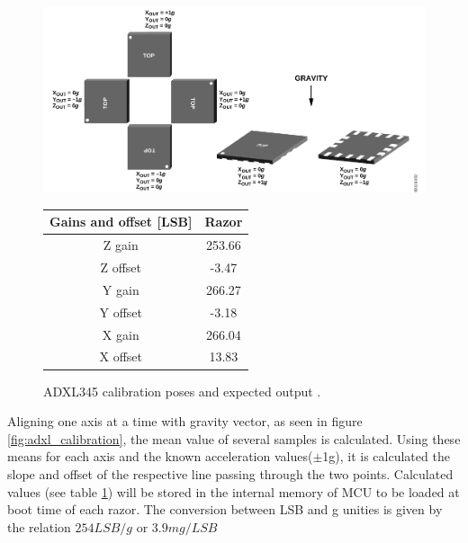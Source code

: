 \begin{figure}[!hbt]
	\begin{minipage}{0.49\textwidth}
		\centering
		\includegraphics[width=\textwidth]{figures/adxl_calibration.png}
		\caption[ADXL345 calibration poses and expected output.]{ADXL345 calibration
			poses and expected output \cite{adxl345AN1077}.} 
		\label{fig:adxl_calibration}
	\end{minipage}
	\hfill
	\begin{minipage}{0.49\textwidth}
		\renewcommand{\arraystretch}{1.2} %
		\centering
		\begin{tabular}{cc}
			\toprule
			\textbf{Gains and offset [LSB]} & \textbf{Razor }\\
			\midrule
			Z gain   &  253.66  \\
			Z offset & -3.47    \\
			Y gain	 & 266.27    \\
			Y offset & -3.18     \\
			X gain   & 266.04   \\
			X offset & 13.83	\\
			\bottomrule
		\end{tabular}
		\label{tab:adxl_summary}
	\end{minipage}
\end{figure}

Aligning one axis at a time with gravity vector, as seen in figure
\ref{fig:adxl_calibration}, the mean value of several samples is calculated.
Using these means for each axis and the known acceleration
values(\ensuremath{\pm}1g), it is calculated the slope and offset of the
respective line passing through the two points. Calculated values (see table \ref{tab:adxl_summary}) will be stored
in the internal  memory of \gls{MCU} to be loaded at
boot time of each razor. The conversion between LSB and g unities is given by
the relation $254LSB/g$ or $3.9mg/LSB$ \cite{adxl345_datasheet}


